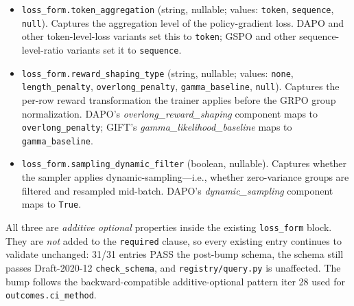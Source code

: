 \documentclass{article}
\begin{document}
\begin{itemize}
  \item \texttt{loss\_form.token\_aggregation} (string, nullable;
    values: \texttt{token}, \texttt{sequence}, \texttt{null}). Captures
    the aggregation level of the policy-gradient loss. DAPO and other
    token-level-loss variants set this to \texttt{token}; GSPO and
    other sequence-level-ratio variants set it to \texttt{sequence}.
  \item \texttt{loss\_form.reward\_shaping\_type} (string, nullable;
    values: \texttt{none}, \texttt{length\_penalty},
    \texttt{overlong\_penalty}, \texttt{gamma\_baseline}, \texttt{null}).
    Captures the per-row reward transformation the trainer applies
    before the GRPO group normalization. DAPO's
    \emph{overlong\_reward\_shaping} component maps to
    \texttt{overlong\_penalty}; GIFT's \emph{gamma\_likelihood\_baseline}
    maps to \texttt{gamma\_baseline}.
  \item \texttt{loss\_form.sampling\_dynamic\_filter} (boolean,
    nullable). Captures whether the sampler applies
    dynamic-sampling---i.e., whether zero-variance groups are filtered
    and resampled mid-batch. DAPO's \emph{dynamic\_sampling} component
    maps to \texttt{True}.
\end{itemize}

All three are \emph{additive optional} properties inside the existing
\texttt{loss\_form} block. They are \emph{not} added to the
\texttt{required} clause, so every existing entry continues to
validate unchanged: 31/31 entries PASS the post-bump schema, the
schema still passes Draft-2020-12 \texttt{check\_schema}, and
\texttt{registry/query.py} is unaffected. The bump follows the
backward-compatible additive-optional pattern iter 28 used for
\texttt{outcomes.ci\_method}.
\end{document}
